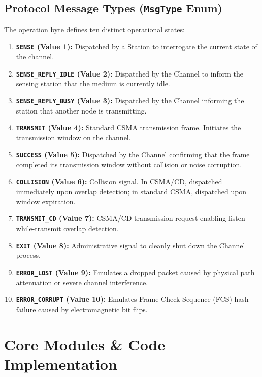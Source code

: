 \documentclass[12pt, a4paper]{article}
\begin{document}
\subsection{Protocol Message Types (\texttt{MsgType} Enum)}
The operation byte defines ten distinct operational states:
\begin{enumerate}
    \item \textbf{\texttt{SENSE} (Value 1):} Dispatched by a Station to interrogate the current state of the channel.
    \item \textbf{\texttt{SENSE\_REPLY\_IDLE} (Value 2):} Dispatched by the Channel to inform the sensing station that the medium is currently idle.
    \item \textbf{\texttt{SENSE\_REPLY\_BUSY} (Value 3):} Dispatched by the Channel informing the station that another node is transmitting.
    \item \textbf{\texttt{TRANSMIT} (Value 4):} Standard CSMA transmission frame. Initiates the transmission window on the channel.
    \item \textbf{\texttt{SUCCESS} (Value 5):} Dispatched by the Channel confirming that the frame completed its transmission window without collision or noise corruption.
    \item \textbf{\texttt{COLLISION} (Value 6):} Collision signal. In CSMA/CD, dispatched immediately upon overlap detection; in standard CSMA, dispatched upon window expiration.
    \item \textbf{\texttt{TRANSMIT\_CD} (Value 7):} CSMA/CD transmission request enabling listen-while-transmit overlap detection.
    \item \textbf{\texttt{EXIT} (Value 8):} Administrative signal to cleanly shut down the Channel process.
    \item \textbf{\texttt{ERROR\_LOST} (Value 9):} Emulates a dropped packet caused by physical path attenuation or severe channel interference.
    \item \textbf{\texttt{ERROR\_CORRUPT} (Value 10):} Emulates Frame Check Sequence (FCS) hash failure caused by electromagnetic bit flips.
\end{enumerate}


\section{Core Modules \& Code Implementation}
\end{document}
